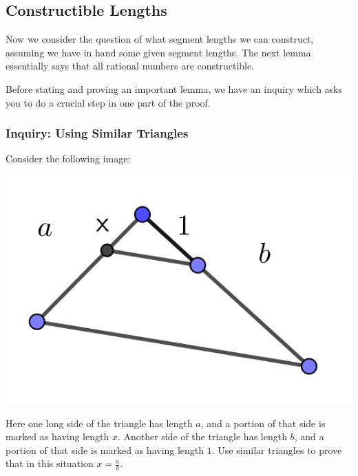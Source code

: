 \documentclass[11pt]{article}
\newenvironment{task}
	{\begin{mdframed}[linecolor=lightgray, linewidth=3pt]\raggedright}
	{\end{mdframed}}
\theoremstyle{definition}
\begin{document}
\subsection{Constructible Lengths}

Now we consider the question of what segment lengths we can construct, assuming we have in hand some given segment lengths. The next lemma essentially
says that all rational numbers are constructible.

Before stating and proving an important lemma, we have an inquiry which asks you to do a crucial step in one part of the proof.

\subsubsection{Inquiry: Using Similar Triangles}
\begin{task}
  Consider the following image:
  \begin{center}
    \includegraphics[scale=1]{Images/a_over_b.png}
  \end{center}
  Here one long side of the triangle has length $a$, and a portion of that side is marked as having length $x$. Another side of the
  triangle has length $b$, and a portion of that side is marked as having length $1$. Use similar triangles to prove that in this situation $x = \frac{a}{b}$.
\end{task}
\end{document}
